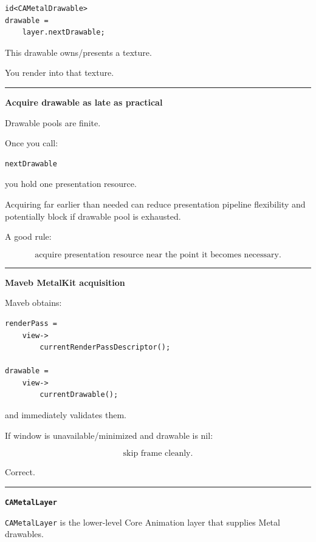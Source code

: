 \begin{verbatim}
id<CAMetalDrawable>
drawable =
    layer.nextDrawable;
\end{verbatim}

This drawable owns/presents a texture.

You render into that texture.

\begin{center}\rule{0.5\linewidth}{0.5pt}\end{center}

\textbf{Acquire drawable as late as practical}

Drawable pools are finite.

Once you call:

\begin{verbatim}
nextDrawable
\end{verbatim}

you hold one presentation resource.

Acquiring far earlier than needed can reduce presentation pipeline flexibility and potentially block if drawable pool is exhausted.

A good rule:

\[
\boxed{
\text{acquire presentation resource near the point it becomes necessary}.
}
\]

\begin{center}\rule{0.5\linewidth}{0.5pt}\end{center}

\textbf{Maveb MetalKit acquisition}

Maveb obtains:

\begin{verbatim}
renderPass =
    view->
        currentRenderPassDescriptor();

drawable =
    view->
        currentDrawable();
\end{verbatim}

and immediately validates them.

If window is unavailable/minimized and drawable is nil:

\[
\boxed{
\text{skip frame cleanly}.
}
\]

Correct.

\begin{center}\rule{0.5\linewidth}{0.5pt}\end{center}

\textbf{\texttt{CAMetalLayer}}

\texttt{CAMetalLayer} is the lower-level Core Animation layer that supplies Metal drawables.

